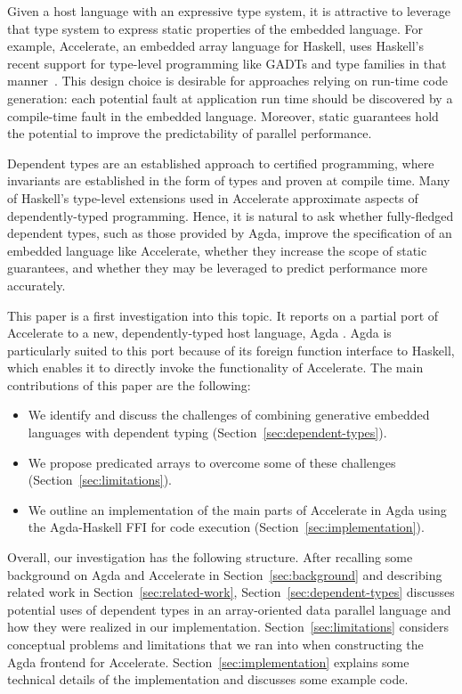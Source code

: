 \documentclass{llncs}
\begin{document}
Given a host language with an expressive type system, it is
attractive to leverage that type system to express static properties
of the embedded language. For example, Accelerate, an embedded array
language for Haskell, uses Haskell's recent support for type-level
programming like GADTs and type families in that
manner~\cite{ChakravartyKellerLeeMcdonellGrover2011}. This design
choice is desirable for approaches relying on run-time code
generation:
each  potential fault at application run time should be discovered by
a compile-time fault in the embedded language. Moreover, static guarantees
hold the potential to improve the predictability of parallel
performance. 

Dependent types \cite{MartinLoef1984} are an established approach to certified programming,
where invariants are established in the form of types and proven at
compile time. Many of Haskell's type-level extensions used in
Accelerate approximate aspects of dependently-typed
programming. Hence, it is natural to ask whether fully-fledged
dependent types, such as those provided by Agda, improve the
specification of an embedded language like Accelerate, whether they
increase the scope of static guarantees, and whether they may be
leveraged to predict performance more accurately. 

This paper is a first investigation into this topic. It reports on a
partial port of Accelerate to a new, dependently-typed host language,
Agda \cite{Norell2008,BoveDybjerNorell2009}. Agda is particularly
suited to this port because of its foreign function interface to
Haskell, which enables it to directly invoke the functionality of
Accelerate. The main contributions of this paper are the following:
%
\begin{itemize}
\item We identify and discuss the challenges of combining generative embedded languages with dependent typing (Section~\ref{sec:dependent-types}).
\item We propose predicated arrays to overcome some of these challenges (Section~\ref{sec:limitations}).
\item We outline an implementation of the main parts of Accelerate in Agda using the Agda-Haskell FFI for code execution (Section~\ref{sec:implementation}).
\end{itemize}
%
Overall, our investigation has the following structure. After recalling some
background on Agda and Accelerate in Section~\ref{sec:background} and
describing related work in Section~\ref{sec:related-work}, 
Section~\ref{sec:dependent-types} discusses potential uses of
dependent types in an array-oriented data parallel language and how they were realized in our
implementation. Section~\ref{sec:limitations} considers conceptual 
problems and limitations that we ran into when constructing the Agda
frontend for Accelerate. Section~\ref{sec:implementation} explains
some technical details of the implementation and discusses some
example code. 
\end{document}
